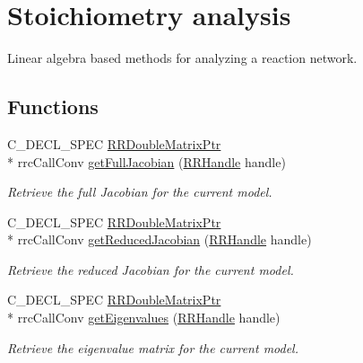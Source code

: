 \hypertarget{group___stoich}{\section{Stoichiometry analysis}
\label{group___stoich}
}


Linear algebra based methods for analyzing a reaction network.  


\subsection*{Functions}
\begin{DoxyCompactItemize}
\item 
C\-\_\-\-D\-E\-C\-L\-\_\-\-S\-P\-E\-C \hyperlink{rrc__types_8h_ae586a879d30f0823087e42d93464b5dd}{R\-R\-Double\-Matrix\-Ptr} \\*
rrc\-Call\-Conv \hyperlink{group___stoich_ga6debd886f8814dec86b8eaa5c9d00a3e}{get\-Full\-Jacobian} (\hyperlink{rrc__types_8h_a1d68f0592372208fa5a5f2799ea4b3ae}{R\-R\-Handle} handle)
\begin{DoxyCompactList}\small\item\em Retrieve the full Jacobian for the current model. \end{DoxyCompactList}\item 
C\-\_\-\-D\-E\-C\-L\-\_\-\-S\-P\-E\-C \hyperlink{rrc__types_8h_ae586a879d30f0823087e42d93464b5dd}{R\-R\-Double\-Matrix\-Ptr} \\*
rrc\-Call\-Conv \hyperlink{group___stoich_ga0f121b1c3787ad8c932174a777a865e2}{get\-Reduced\-Jacobian} (\hyperlink{rrc__types_8h_a1d68f0592372208fa5a5f2799ea4b3ae}{R\-R\-Handle} handle)
\begin{DoxyCompactList}\small\item\em Retrieve the reduced Jacobian for the current model. \end{DoxyCompactList}\item 
C\-\_\-\-D\-E\-C\-L\-\_\-\-S\-P\-E\-C \hyperlink{rrc__types_8h_ae586a879d30f0823087e42d93464b5dd}{R\-R\-Double\-Matrix\-Ptr} \\*
rrc\-Call\-Conv \hyperlink{group___stoich_ga2f8e012b9cefe206bdbac30f07619613}{get\-Eigenvalues} (\hyperlink{rrc__types_8h_a1d68f0592372208fa5a5f2799ea4b3ae}{R\-R\-Handle} handle)
\begin{DoxyCompactList}\small\item\em Retrieve the eigenvalue matrix for the current model. \end{DoxyCompactList}\item 

\end{DoxyCompactItemize}
